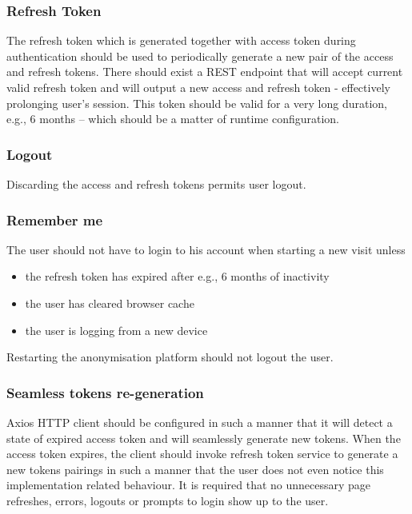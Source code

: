 \documentclass[a4paper,twoside,12pt]{book}
\begin{document}
\subsubsection{Refresh Token}

The refresh token which is generated together with access token during authentication should be used to periodically generate a new pair of the access and refresh tokens. There should exist a REST endpoint that will accept current valid refresh token and will output a new access and refresh token - effectively prolonging user's session. This token should be valid for a very long duration, e.g., 6 months – which should be a matter of runtime configuration.

\subsubsection{Logout}

Discarding the access and refresh tokens permits user logout.

\subsubsection{Remember me}

The user should not have to login to his account when starting a new visit unless
\begin{itemize}
\item the refresh token has expired after e.g., 6 months of inactivity
\item the user has cleared browser cache
\item the user is logging from a new device
\end{itemize}

Restarting the anonymisation platform should not logout the user.

\subsubsection{Seamless tokens re-generation}

Axios HTTP client should be configured in such a manner that it will detect a state of expired access token and will seamlessly generate new tokens. When the access token expires, the client should invoke refresh token service to generate a new tokens pairings in such a manner that the user does not even notice this implementation related behaviour. It is required that no unnecessary page refreshes, errors, logouts or prompts to login show up to the user.
\end{document}
